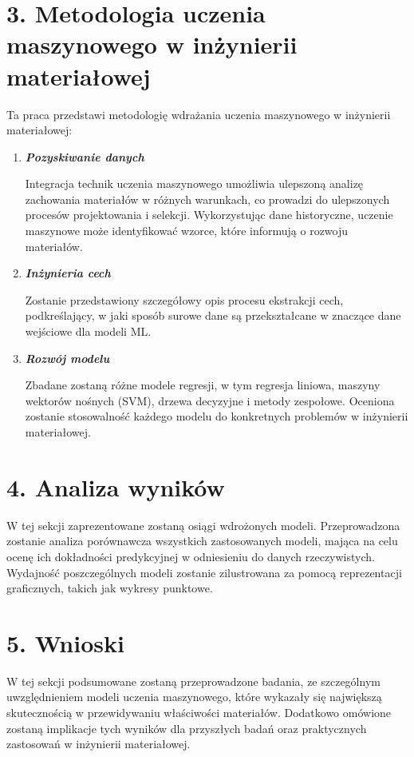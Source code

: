 {}
\section*{3. Metodologia uczenia maszynowego w inżynierii materiałowej}
\vspace{-1.0em}
\label{sec:margins}
Ta praca przedstawi metodologię wdrażania uczenia maszynowego w inżynierii materiałowej:


\begin{enumerate}
    \item \textbf{\textit{Pozyskiwanie danych}}


Integracja technik uczenia maszynowego umożliwia ulepszoną analizę zachowania materiałów w różnych warunkach, co prowadzi do ulepszonych procesów projektowania i selekcji.
Wykorzystując dane historyczne, uczenie maszynowe może identyfikować wzorce, które informują o rozwoju materiałów.

\item \textbf{\textit{Inżynieria cech}}


Zostanie przedstawiony szczegółowy opis procesu ekstrakcji cech, podkreślający, w jaki sposób surowe dane są przekształcane w znaczące dane wejściowe dla modeli ML.


\item \textbf{\textit{Rozwój modelu}}


Zbadane zostaną różne modele regresji, w tym regresja liniowa, maszyny wektorów nośnych (SVM), drzewa decyzyjne i metody zespołowe.
Oceniona zostanie stosowalność każdego modelu do konkretnych problemów w inżynierii materiałowej.
\end{enumerate}

{}

\section*{4. Analiza wyników}
\vspace{-1.0em}
\label{sec:margins}
W tej sekcji zaprezentowane zostaną osiągi wdrożonych modeli. Przeprowadzona zostanie analiza porównawcza wszystkich zastosowanych modeli, mająca na celu ocenę ich dokładności predykcyjnej w odniesieniu do danych rzeczywistych. Wydajność poszczególnych modeli zostanie zilustrowana za pomocą reprezentacji graficznych, takich jak wykresy punktowe.



{}
\section*{5. Wnioski}
\vspace{-1.0em}
\label{sec:margins}
W tej sekcji podsumowane zostaną przeprowadzone badania, ze szczególnym uwzględnieniem modeli uczenia maszynowego, które wykazały się największą skutecznością w przewidywaniu właściwości materiałów. Dodatkowo omówione zostaną implikacje tych wyników dla przyszłych badań oraz praktycznych zastosowań w inżynierii materiałowej.
\clearpage
